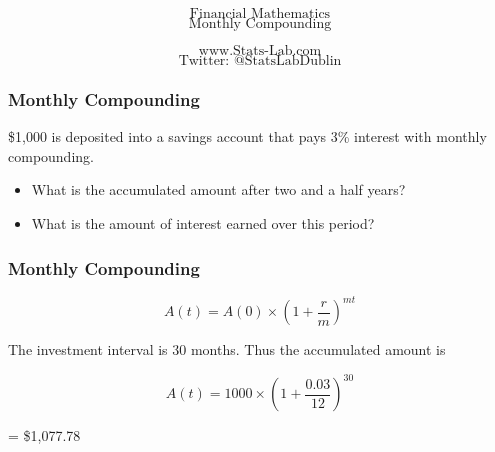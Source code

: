 \documentclass{beamer}
\begin{document}
\begin{frame}
\bigskip
{
\Huge
\[ \mbox{Financial Mathematics}  \]
\huge
\[ \mbox{Monthly Compounding}  \]
}

{
\LARGE
\[ \mbox{www.Stats-Lab.com}  \]
\[ \mbox{Twitter: @StatsLabDublin} \]
}
\end{frame}
\begin{frame}
\frametitle{Monthly Compounding}
\Large

\$1,000 is deposited into a savings account that pays 3\%
interest with monthly compounding. 


\begin{itemize}
\item What is the accumulated amount
after two and a half years? 
\item What is the amount of interest earned over
this period?
\end{itemize}
\end{frame}
\begin{frame}
\frametitle{Monthly Compounding}
\Large


\[ A(t) = A(0) \times \left( 1 + \frac{r}{m} \right)^{mt}  \]

The investment interval is 30 months. Thus the
accumulated amount is

\[ A(t) = 1000 \times \left( 1 + \frac{0.03}{12} \right)^{30}  \]

= \$1,077.78


\end{frame}
\end{document}
